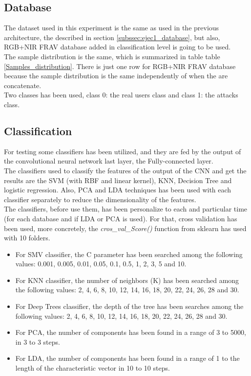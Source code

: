 \subsection{Database}
The dataset used in this experiment is the same as used in the previous architecture, the described in section \ref{subssec:ejec1_database}, but also, RGB+NIR FRAV database added in classification level is going to be used.\\

The sample distribution is the same, which is summarized in table table \ref{Samples_distribution}. There is just one row for RGB+NIR FRAV database because the sample distribution is the same independently of when the are concatenate.\\

Two classes has been used, class 0: the real users class and class 1: the attacks class.\\

\subsection{Classification}
For testing some classifiers has been utilized, and they are fed by the output of the convolutional neural network last layer, the Fully-connected layer.\\

The classifiers used to classify the features of the output of the CNN and get the results are the SVM (with RBF and linear kernel), KNN, Decision Tree and logistic regression. Also, PCA and LDA techniques has been used with each classifier separately to reduce the dimensionality of the features.\\

The classifiers, before use them, has been personalize to each and particular time (for each database and if LDA or PCA is used). For that, cross validation has been used, more concretely, the \textit{cros\_val\_Score()} function from sklearn has used with 10 folders.\\

\begin{itemize}
\item For SMV classifier, the C parameter has been searched among the following values: 0.001, 0.005, 0.01, 0.05, 0.1, 0.5, 1, 2, 3, 5 and 10.
\item For KNN classifier, the number of neighbors (K) has been searched among the following values: 2, 4, 6, 8, 10, 12, 14, 16, 18, 20, 22, 24, 26, 28 and 30.
\item For Deep Trees classifier, the depth of the tree has been searches among the following values: 2, 4, 6, 8, 10, 12, 14, 16, 18, 20, 22, 24, 26, 28 and 30.
\item For PCA, the number of components has been found in a range of 3 to 5000, in 3 to 3 steps.
\item For LDA, the number of components has been found in a range of 1 to the length of the characteristic vector in 10 to 10 steps.
\end{itemize}

\clearpage
